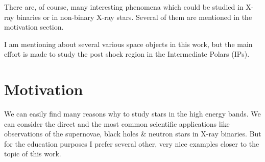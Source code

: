 \documentclass[oneside,a4paper,11pt]{report}
\begin{document}
There are, of course, many interesting phenomena which could be studied in X-ray binaries or in non-binary X-ray stars. 
Several of them are mentioned in the motivation section. 

I am mentioning about several various space objects in this work, but the main effort is made to 
study the post shock region in the Intermediate Polars (IPs).   


\section{Motivation}
We can easily find many reasons why to study stars in the high energy bands.  
We can consider the direct and the most common scientific applications like observations of 
the supernovae, black holes \& neutron stars in X-ray binaries. But for the education purposes 
I prefer several other, very nice examples closer to the topic of this work.  
\end{document}
